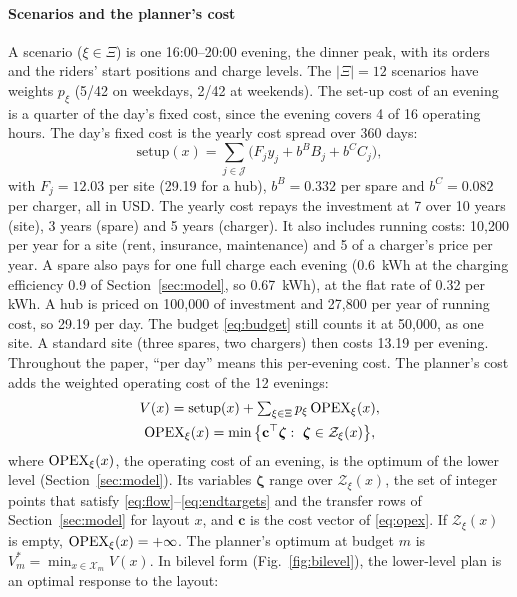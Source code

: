 


\paragraph*{Scenarios and the planner's cost}\label{sec:model:objective}
A scenario ($\xi\in\Xi$) is one 16:00--20:00 evening, the dinner peak, with its orders and the riders' start positions and charge levels. The $|\Xi|=12$ scenarios have weights $p_\xi$ (5/42 on weekdays, 2/42 at weekends). The set-up cost of an evening is a quarter of the day's fixed cost, since the evening covers 4 of 16 operating hours. The day's fixed cost is the yearly cost spread over 360 days:
\begin{equation}\label{eq:setup}
  \mathrm{setup}(x)=\textstyle\sum_{j\in\mathcal J}\big(F_jy_j+b^BB_j+b^CC_j\big),
\end{equation}
with $F_j=12.03$ per site (29.19 for a hub), $b^B=0.332$ per spare and $b^C=0.082$ per charger, all in USD. The yearly cost repays the investment at 7\pct{} over 10 years (site), 3 years (spare) and 5 years (charger). It also includes running costs: 10,200 per year for a site (rent, insurance, maintenance) and 5\pct{} of a charger's price per year. A spare also pays for one full charge each evening (0.6~kWh at the charging efficiency 0.9 of Section~\ref{sec:model}, so 0.67~kWh), at the flat rate of 0.32\usd{} per kWh. A hub is priced on 100,000\usd{} of investment and 27,800 per year of running cost, so 29.19 per day. The budget \eqref{eq:budget} still counts it at 50,000, as one site. A standard site (three spares, two chargers) then costs 13.19\usd{} per evening. Throughout the paper, ``per day'' means this per-evening cost. The planner's cost adds the weighted operating cost of the 12 evenings:
\begin{equation}\label{eq:siting}
  \begin{gathered}
  V(x)=\mathrm{setup}(x)+\textstyle\sum_{\xi\in\Xi}p_\xi\,\OPEX_\xi(x),\\
  \OPEX_\xi(x)=\min\big\{\mathbf c^\top\boldsymbol\zeta:\ \boldsymbol\zeta\in\mathcal Z_\xi(x)\big\},
  \end{gathered}
\end{equation}
where $\mathrm{OPEX}_\xi(x)$, the operating cost of an evening, is the optimum of the lower level (Section~\ref{sec:model}). Its variables $\boldsymbol\zeta$ range over $\mathcal Z_\xi(x)$, the set of integer points that satisfy \eqref{eq:flow}--\eqref{eq:endtargets} and the transfer rows of Section~\ref{sec:model} for layout $x$, and $\mathbf c$ is the cost vector of \eqref{eq:opex}. If $\mathcal Z_\xi(x)$ is empty, $\mathrm{OPEX}_\xi(x)=+\infty$. The planner's optimum at budget $m$ is $V^*_m=\min_{x\in\mathcal X_m}V(x)$. In bilevel form (Fig.~\ref{fig:bilevel}), the lower-level plan is an optimal response to the layout:
